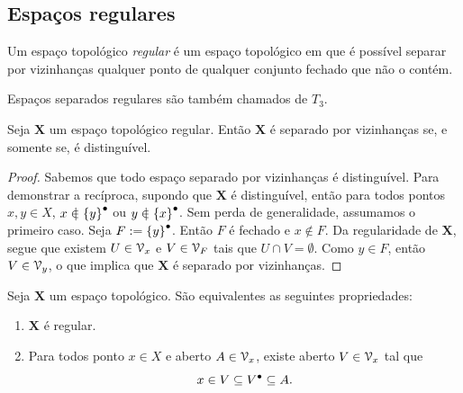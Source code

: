 \subsection{Espaços regulares}

\begin{definition}
Um espaço topológico \emph{regular} é um espaço topológico
em que é possível separar por vizinhanças qualquer ponto de qualquer conjunto fechado que não o contém.
\end{definition}

Espaços separados regulares são também chamados de $T_3$.

\begin{proposition}
Seja $\bm X$ um espaço topológico regular. Então $\bm X$ é separado por vizinhanças se, e somente se, é distinguível.
\end{proposition}
\begin{proof}
Sabemos que todo espaço separado por vizinhanças é distinguível. Para demonstrar a recíproca, supondo que $\bm X$ é distinguível, então para todos pontos $x,y \in X$, $x \notin \Fec{\{y\}}$ ou $y \notin \Fec{\{x\}}$. Sem perda de generalidade, assumamos o primeiro caso. Seja $F := {\{y\}}^\bullet$. Então $F$ é fechado e $x \notin F$. Da regularidade de $\bm X$, segue que existem $U \in \mathcal{V}_x$ e $V \in \mathcal{V}_{F}$ tais que $U \cap V = \emptyset$. Como $y \in F$, então $V \in \mathcal{V}_y$, o que implica que $\bm X$ é separado por vizinhanças.
\end{proof}

\begin{proposition}
Seja $\bm X$ um espaço topológico. São equivalentes as seguintes propriedades:
	\begin{enumerate}
	\item $\bm X$ é regular.
	\item Para todos ponto $x \in X$ e aberto $A \in \mathcal{V}_x$, existe aberto $V \in \mathcal{V}_x$ tal que
		\begin{equation*}
		x \in V \subseteq {V}^\bullet \subseteq A.
		\end{equation*}
	\end{enumerate}
\end{proposition}

